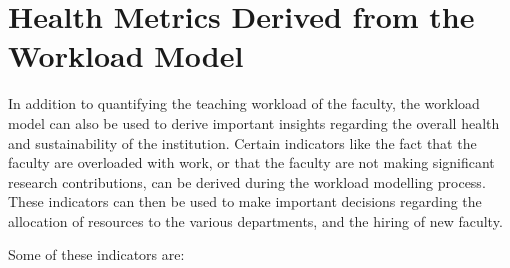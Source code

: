 
\section{Health Metrics Derived from the Workload Model}

In addition to quantifying the teaching workload of the faculty, the workload model can also be used to derive important insights regarding the overall health and sustainability of the institution. Certain indicators like the fact that the faculty are overloaded with work, or that the faculty are not making significant research contributions, can be derived during the workload modelling process. These indicators can then be used to make important decisions regarding the allocation of resources to the various departments, and the hiring of new faculty.

Some of these indicators are:

